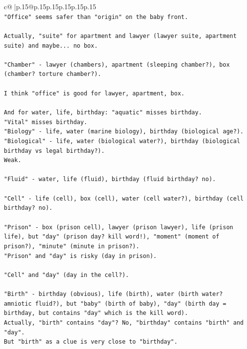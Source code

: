 \documentclass{article}
\begin{document}
{\begin{supertabular}{c@{$\;$}|p{.15\linewidth}@{}p{.15\linewidth}p{.15\linewidth}p{.15\linewidth}p{.15\linewidth}p{.15\linewidth}}
{{{\\ 
\texttt{"Office" seems safer than "origin" on the baby front.} \\
\\ 
\texttt{Actually, "suite" for apartment and lawyer (lawyer suite, apartment suite) and maybe... no box.} \\
\\ 
\texttt{"Chamber" {-} lawyer (chambers), apartment (sleeping chamber?), box (chamber? torture chamber?).} \\
\\ 
\texttt{I think "office" is good for lawyer, apartment, box.} \\
\\ 
\texttt{And for water, life, birthday: "aquatic" misses birthday.} \\
\texttt{"Vital" misses birthday.} \\
\texttt{"Biology" {-} life, water (marine biology), birthday (biological age?).} \\
\texttt{"Biological" {-} life, water (biological water?), birthday (biological birthday vs legal birthday?).} \\
\texttt{Weak.} \\
\\ 
\texttt{"Fluid" {-} water, life (fluid), birthday (fluid birthday? no).} \\
\\ 
\texttt{"Cell" {-} life (cell), box (cell), water (cell water?), birthday (cell birthday? no).} \\
\\ 
\texttt{"Prison" {-} box (prison cell), lawyer (prison lawyer), life (prison life), but "day" (prison day? kill word!), "moment" (moment of prison?), "minute" (minute in prison?).} \\
\texttt{"Prison" and "day" is risky (day in prison).} \\
\\ 
\texttt{"Cell" and "day" (day in the cell?).} \\
\\ 
\texttt{"Birth" {-} birthday (obvious), life (birth), water (birth water? amniotic fluid?), but "baby" (birth of baby), "day" (birth day = birthday, but contains "day" which is the kill word).} \\
\texttt{Actually, "birth" contains "day"? No, "birthday" contains "birth" and "day".} \\
\texttt{But "birth" as a clue is very close to "birthday".} \\
}}}
\end{supertabular}}
\end{document}
